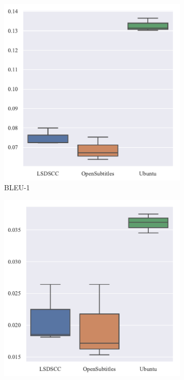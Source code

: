 \begin{figure}[H]
    \begin{subfigure}{0.25\linewidth}
        \centering
        \includegraphics[width=\linewidth]{figure/boxplot/dataset/bleu_1/plot.pdf}
        \caption{BLEU-1}
    \end{subfigure}%
    \begin{subfigure}{0.25\linewidth}
        \centering
        \includegraphics[width=\linewidth]{figure/boxplot/dataset/bleu_2/plot.pdf}

\end{subfigure}
\end{figure}
